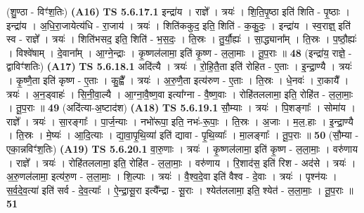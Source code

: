 \documentclass[17pt]{extarticle}
\begin{document}
                      (शु॒ण्ठा - विꣳ॑श॒तिः)  \textbf{(A16)} \newline \newline
                                \textbf{ TS 5.6.17.1} \newline
                  इन्द्रा॑य । राज्ञे᳚ । त्रयः॑ । शि॒ति॒पृ॒ष्ठा इति॑ शिति - पृ॒ष्ठाः । इन्द्रा॑य । अ॒धि॒रा॒जायेत्य॑धि - रा॒जाय॑ । त्रयः॑ । शिति॑ककुद॒ इति॒ शिति॑ - क॒कु॒दः॒ । इन्द्रा॑य । स्व॒राज्ञ्॒ इति॑ स्व - राज्ञे᳚ । त्रयः॑ । शिति॑भसद॒ इति॒ शिति॑ - भ॒स॒दः॒ । ति॒स्रः । तु॒र्यौ॒ह्यः॑ । सा॒द्ध्याना᳚म् । ति॒स्रः । प॒ष्ठौ॒ह्यः॑ । विश्वे॑षाम् । दे॒वाना᳚म् । आ॒ग्ने॒न्द्राः । कृ॒ष्णल॑लामा॒ इति॑ कृ॒ष्ण - ल॒ला॒माः । तू॒प॒राः ॥ \textbf{  48} \newline
                  \newline
                      (इन्द्रा॑य॒ राज्ञे॒ - द्वाविꣳ॑शतिः)  \textbf{(A17)} \newline \newline
                                \textbf{ TS 5.6.18.1} \newline
                  अदि॑त्यै । त्रयः॑ । रो॒हि॒तै॒ता इति॑ रोहित - ए॒ताः । इ॒न्द्रा॒ण्यै । त्रयः॑ । कृ॒ष्णै॒ता इति॑ कृष्ण - ए॒ताः । कु॒ह्वै᳚ । त्रयः॑ । अ॒रु॒णै॒ता इत्य॑रुण - ए॒ताः । ति॒स्रः । धे॒नवः॑ । रा॒कायै᳚ । त्रयः॑ । अ॒न॒ड्वाहः॑ । सि॒नी॒वा॒ल्यै । आ॒ग्ना॒वै॒ष्ण॒वा इत्या᳚ग्ना - वै॒ष्ण॒वाः । रोहि॑तललामा॒ इति॒ रोहि॑त - ल॒ला॒माः॒ । तू॒प॒राः ॥ \textbf{  49 } \newline
                  \newline
                      (अदि॑त्या-अ॒ष्टाद॑श)  \textbf{(A18)} \newline \newline
                                \textbf{ TS 5.6.19.1} \newline
                  सौ॒म्याः । त्रयः॑ । पि॒शङ्गाः᳚ । सोमा॑य । राज्ञे᳚ । त्रयः॑ । सा॒रङ्गाः᳚ । पा॒र्ज॒न्याः । नभो॑रूपा॒ इति॒ नभः॑-रू॒पाः॒ । ति॒स्रः । अ॒जाः । म॒ल॒.हाः । इ॒न्द्रा॒ण्यै । ति॒स्रः । मे॒ष्यः॑ । आ॒दि॒त्याः । द्या॒वा॒पृ॒थि॒व्या॑ इति॑ द्यावा - पृ॒थि॒व्याः᳚ । मा॒लङ्गाः᳚ । तू॒प॒राः ॥ \textbf{  50} \newline
                  \newline
                      (सौ॒म्या - एका॒न्नविꣳ॑श॒तिः)  \textbf{(A19)} \newline \newline
                                \textbf{ TS 5.6.20.1} \newline
                  वा॒रु॒णाः । त्रयः॑ । कृ॒ष्णल॑लामा॒ इति॑ कृ॒ष्ण - ल॒ला॒माः॒ । वरु॑णाय । राज्ञे᳚ । त्रयः॑ । रोहि॑तललामा॒ इति॒ रोहि॑त - ल॒ला॒माः॒ । वरु॑णाय । रि॒शाद॑स॒ इति॑ रिश - अद॑से । त्रयः॑ । अ॒रु॒णल॑लामा॒ इत्य॑रु॒ण - ल॒ला॒माः॒ । शि॒ल्पाः । त्रयः॑ । वै॒श्व॒दे॒वा इति॑ वैश्व - दे॒वाः । त्रयः॑ । पृश्न॑यः । स॒र्व॒दे॒व॒त्या॑ इति॑ सर्व - दे॒व॒त्याः᳚ । ऐ॒न्द्रा॒सू॒रा इत्यै᳚न्द्रा - सू॒राः । श्येत॑ललामा॒ इति॒ श्येत॑ - ल॒ला॒माः॒ । तू॒प॒राः ॥ \textbf{  51} \newline
\end{document}
